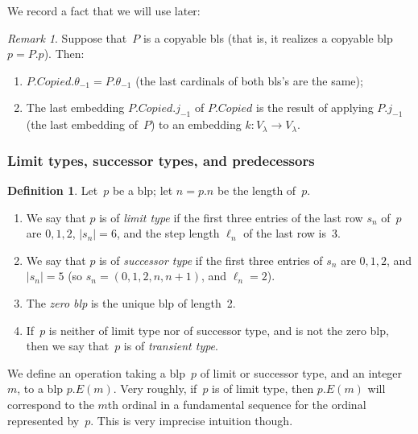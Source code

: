 \documentclass{article}
\theoremstyle{definition}
\newtheorem{definition}[lemma]{Definition}
\theoremstyle{remark}
\newtheorem{remark}[lemma]{Remark}
\begin{document}
We record a fact that we will use later:

\begin{remark} \label{rmk:last_embedding_of_P_copied}
  Suppose that~$P$ is a copyable bls (that is, it realizes a copyable blp $p = P.p$). Then:
  \begin{enumerate}
    \item $P.Copied.\theta_{-1} = P.\theta_{-1}$ (the last cardinals of both bls's are the same); 
    \item The last embedding $P.Copied.j_{-1}$ of $P.Copied$ is the result of applying $P.j_{-1}$ (the last embedding of~$P$) to an embedding $k\colon V_\lambda\to V_\lambda$. 
  \end{enumerate}
\end{remark}


\subsubsection*{Limit types, successor types, and predecessors}

\begin{definition} \label{def:limit_and_successor_types} 
Let~$p$ be a blp; let $n = p.n$ be the length of~$p$.
\begin{enumerate}
  \item We say that $p$ is of \emph{limit type} if the first three entries of the last row $s_n$ of~$p$ are $0,1,2$, $|s_n|=6$, and the step length $\ell_n$ of the last row is~3.

  \item We say that $p$ is of \emph{successor type} if the first three entries of $s_n$ are $0,1,2$, and $|s_n|=5$ (so $s_n = (0,1,2,n,n+1)$, and $\ell_n=2$).

  \item The \emph{zero blp} is the unique blp of length~2. 

  \item If~$p$ is neither of limit type nor of successor type, and is not the zero blp, then we say that~$p$ is of \emph{transient type}.
\end{enumerate}
\end{definition}

We define an operation taking a blp~$p$ of limit or successor type, and an integer~$m$, to a blp $p.E(m)$. Very roughly, if~$p$ is of limit type, then $p.E(m)$ will correspond to the $m$th ordinal in a fundamental sequence for the ordinal represented by~$p$. This is very imprecise intuition though. 
\end{document}
